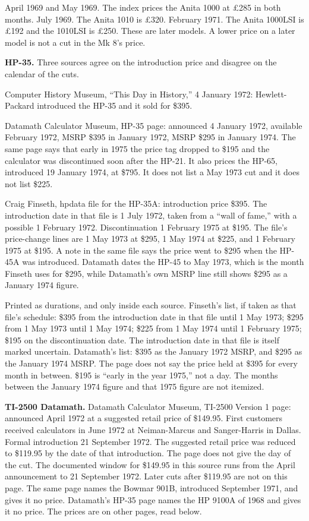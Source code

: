 \documentclass[
  10pt,
]{article}
\begin{document}
April 1969 and May 1969. The index prices the Anita 1000 at £285 in both
months. July 1969. The Anita 1010 is £320. February 1971. The Anita
1000LSI is £192 and the 1010LSI is £250. These are later models. A lower
price on a later model is not a cut in the Mk 8's price.

\textbf{HP-35.} Three sources agree on the introduction price and
disagree on the calendar of the cuts.

Computer History Museum, ``This Day in History,'' 4 January 1972:
Hewlett-Packard introduced the HP-35 and it sold for \$395.

Datamath Calculator Museum, HP-35 page: announced 4 January 1972,
available February 1972, MSRP \$395 in January 1972, MSRP \$295 in
January 1974. The same page says that early in 1975 the price tag
dropped to \$195 and the calculator was discontinued soon after the
HP-21. It also prices the HP-65, introduced 19 January 1974, at \$795.
It does not list a May 1973 cut and it does not list \$225.

Craig Finseth, hpdata file for the HP-35A: introduction price \$395. The
introduction date in that file is 1 July 1972, taken from a ``wall of
fame,'' with a possible 1 February 1972. Discontinuation 1 February 1975
at \$195. The file's price-change lines are 1 May 1973 at \$295, 1 May
1974 at \$225, and 1 February 1975 at \$195. A note in the same file
says the price went to \$295 when the HP-45A was introduced. Datamath
dates the HP-45 to May 1973, which is the month Finseth uses for \$295,
while Datamath's own MSRP line still shows \$295 as a January 1974
figure.

Printed as durations, and only inside each source. Finseth's list, if
taken as that file's schedule: \$395 from the introduction date in that
file until 1 May 1973; \$295 from 1 May 1973 until 1 May 1974; \$225
from 1 May 1974 until 1 February 1975; \$195 on the discontinuation
date. The introduction date in that file is itself marked uncertain.
Datamath's list: \$395 as the January 1972 MSRP, and \$295 as the
January 1974 MSRP. The page does not say the price held at \$395 for
every month in between. \$195 is ``early in the year 1975,'' not a day.
The months between the January 1974 figure and that 1975 figure are not
itemized.

\textbf{TI-2500 Datamath.} Datamath Calculator Museum, TI-2500 Version 1
page: announced April 1972 at a suggested retail price of \$149.95.
First customers received calculators in June 1972 at Neiman-Marcus and
Sanger-Harris in Dallas. Formal introduction 21 September 1972. The
suggested retail price was reduced to \$119.95 by the date of that
introduction. The page does not give the day of the cut. The documented
window for \$149.95 in this source runs from the April announcement to
21 September 1972. Later cuts after \$119.95 are not on this page. The
same page names the Bowmar 901B, introduced September 1971, and gives it
no price. Datamath's HP-35 page names the HP 9100A of 1968 and gives it
no price. The prices are on other pages, read below.
\end{document}
